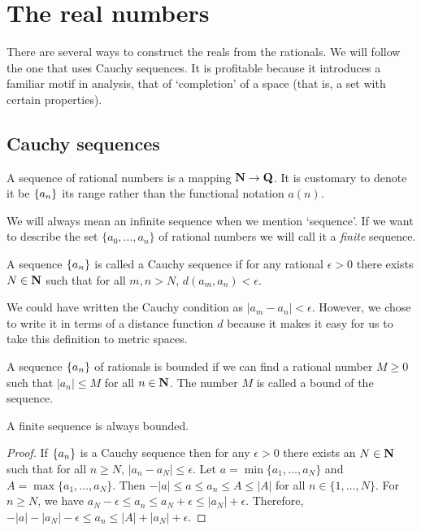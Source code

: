 \chapter{The real numbers}\label{c4}
There are several ways to construct the reals from the rationals. We will
follow the one that uses Cauchy sequences. It is profitable because it 
introduces a familiar motif in analysis, that of `completion' of a space
(that is, a set with certain properties).

\section{Cauchy sequences}\label{c4s1}
\begin{defn}\label{c4s1d1}
A sequence of rational numbers is a mapping $\mathbf{N} \rightarrow \mathbf{Q}$. It is
customary to denote it be $\{a_n\}$ its range rather than the functional
notation $a(n)$.
\end{defn}

\begin{rem}
We will always mean an infinite sequence when we mention `sequence'. If we
want to describe the set $\{a_0, \ldots, a_n\}$ of rational numbers we will
call it a \emph{finite} sequence.
\end{rem}

\begin{defn}\label{c4s1d2}
A sequence $\{a_n\}$ is called a Cauchy sequence if for any rational 
$\epsilon > 0$ there exists $N \in \mathbf{N}$ such that for all $m, n > N$,
$d(a_m, a_n) < \epsilon$.
\end{defn}

\begin{rem}
We could have written the Cauchy condition as $|a_m - a_n| < \epsilon$. 
However, we chose to write it in terms of a distance function $d$ because
it makes it easy for us to take this definition to metric spaces.
\end{rem}

\begin{defn}\label{c4s1d3}
A sequence $\{a_n\}$ of rationals is bounded if we can find a rational 
number $M \ge 0$ such that $|a_n| \le M$ for all $n \in \mathbf{N}$. The number
$M$ is called a bound of the sequence.
\end{defn}

\begin{lem}\label{c4s1l1}
A finite sequence is always bounded.
\end{lem}
\begin{proof}
If $\{a_n\}$ is a Cauchy sequence then for any $\epsilon > 0$ there exists
an $N \in \mathbf{N}$ such that for all $n \ge N$, $|a_n - a_N| \le \epsilon$. Let
$a = \min\{a_1, \ldots, a_N\}$ and $A = \max\{a_1, \ldots, a_N\}$. Then
$-|a| \le a \le a_n \le A \le |A|$ for all $n \in \{1, \ldots, N\}$. For 
$n \ge N$, we have $a_N - \epsilon \le a_n \le a_N + \epsilon \le |a_N| + 
\epsilon$. Therefore, $-|a| - |a_N| - \epsilon \le a_n \le |A| + |a_N| + 
\epsilon$.
\end{proof}


